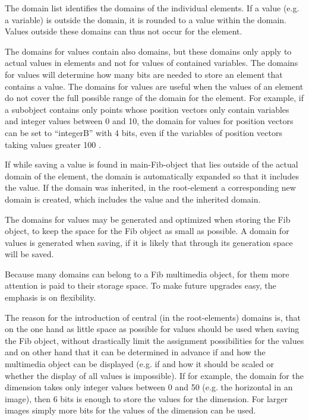 The domain list identifies the domains of the individual elements. If a value (e.g. a variable) is outside the domain, it is rounded to a value within the domain. Values outside these domains can thus not occur for the element.

The domains for values contain also domains, but these domains only apply to actual values in elements and not for values of contained variables. The domains for values will determine how many bits are needed to store an element that contains a value.
The domains for values are useful when the values of an element do not cover the full possible range of the domain for the element. For example, if a subobject contains only points whose position vectors only contain variables and integer values between 0 and 10, the domain for values for position vectors can be set to ``integerB'' with 4 bits, even if the variables of position vectors taking values greater 100 .

If while saving a value is found in main-Fib-object that lies outside of the actual domain of the element, the domain is automatically expanded so that it includes the value. If the domain was inherited, in the root-element a corresponding new domain is created, which includes the value and the inherited domain.

The domains for values may be generated and optimized when storing the Fib object, to keep the space for the Fib object as small as possible. A domain for values is generated when saving, if it is likely that through its generation space will be saved.

Because many domains can belong to a Fib multimedia object, for them more attention is paid to their storage space. To make future upgrades easy, the emphasis is on flexibility.

The reason for the introduction of central (in the root-elements) domains is, that on the one hand as little space as possible for values should be used when saving the Fib object, without drastically limit the assignment possibilities for the values and on other hand that it can be determined in advance if and how the multimedia object can be displayed (e.g. if and how it should be scaled or whether the display of all values is impossible). If for example, the domain for the dimension takes only integer values between 0 and 50 (e.g. the horizontal in an image), then 6 bits is enough to store the values for the dimension. For larger images simply more bits for the values of the dimension can be used.

